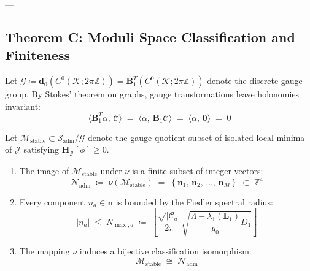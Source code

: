 \documentclass[
    12pt,
    a4paper,
    headings=normal,
    twoside=false,
    open=any,
    parskip=half
]{scrbook}
\newcommand{\moduliAdm}{\mathscr{S}_{\text{adm}}}
\newcommand{\moduliStable}{\mathscr{M}_{\text{stable}}}
\newcommand{\spectrumN}{\mathcal{N}_{\text{adm}}}
\begin{document}
---

\subsection{Theorem C: Moduli Space Classification and Finiteness}

Let $\mathscr{G} \coloneqq \mathbf{d}_0(C^0(\mathcal{K}; 2\pi\mathbb{Z})) = \mathbf{B}_1^T(C^0(\mathcal{K}; 2\pi\mathbb{Z}))$ denote the discrete gauge group. By Stokes' theorem on graphs, gauge transformations leave holonomies invariant:
\begin{equation}
\langle \mathbf{B}_1^T \alpha, \, \mathcal{C} \rangle \;=\; \langle \alpha, \, \mathbf{B}_1 \mathcal{C} \rangle \;=\; \langle \alpha, \, \mathbf{0} \rangle \;=\; 0
\end{equation}

\begin{phystheorem}\label{thm:ch1_theorem_C_moduli_classification}
Let $\moduliStable \subset \moduliAdm / \mathscr{G}$ denote the gauge-quotient subset of isolated local minima of $\mathcal{J}$ satisfying $\mathbf{H}_{\mathcal{J}}[\phi] \ge 0$.
\begin{enumerate}[label=(\alph*), noitemsep]
    \item The image of $\moduliStable$ under $\nu$ is a finite subset of integer vectors:
    \begin{equation}
    \boxed{\spectrumN \;\coloneqq\; \nu\left( \moduliStable \right) \;=\; \left\{ \mathbf{n}_1, \, \mathbf{n}_2, \, \dots, \, \mathbf{n}_M \right\} \;\subset\; \mathbb{Z}^4}
    \label{eq:ch1_admissible_spectrum_definition}
    \end{equation}
    \item Every component $n_a \in \mathbf{n}$ is bounded by the Fiedler spectral radius:
    \begin{equation}
    \boxed{|n_a| \;\le\; N_{\max, a} \;\coloneqq\; \left\lfloor \frac{\sqrt{|\mathcal{C}_a|}}{2\pi} \sqrt{\frac{\Lambda - \lambda_1(\mathbf{L}_1)}{g_0} D_1} \right\rfloor}
    \label{eq:ch1_fiedler_n_max_bound}
    \end{equation}
    \item The mapping $\nu$ induces a bijective classification isomorphism:
    \begin{equation}
    \moduliStable \;\cong\; \spectrumN
    \label{eq:ch1_moduli_isomorphism}
    \end{equation}
\end{enumerate}
\end{phystheorem}
\end{document}
